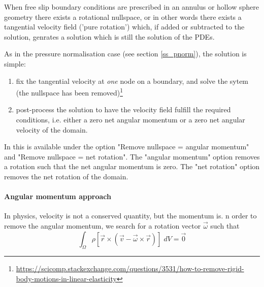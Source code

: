 
When free slip boundary conditions are prescribed in an annulus or
hollow sphere geometry there exists a rotational nullspace, or in other words there exists
a tangential velocity field ('pure rotation') which, 
if added or subtracted to the solution, genrates a solution which is still the solution of the PDEs. 

As in the pressure normalisation case (see section \ref{ss_pnorm}), the solution is simple:
\begin{enumerate}
\item fix the tangential velocity at {\it one} node on a boundary, and solve the sytem (the nullspace 
has been removed)\footnote{\url{https://scicomp.stackexchange.com/questions/3531/how-to-remove-rigid-body-motions-in-linear-elasticity}}
\item post-process the solution to have the velocity field fulfill the required conditions, i.e.
either a zero net angular momentum or a zero net angular velocity of the domain. 
\end{enumerate}

\begin{remark}
In \aspect{} this is available under the option 
"Remove nullspace = angular momentum" and "Remove nullspace = net rotation".
The "angular momentum" option removes a rotation such that the net angular momentum is zero.
The "net rotation" option removes the net rotation of the domain.
\end{remark}

\paragraph{Angular momentum approach}

In physics, velocity is not a conserved quantity, but the momentum is. 
n order to remove the angular momentum, we search for a rotation
vector ${\vec \omega}$ such that
\begin{equation}
\int_\Omega \rho[{\vec r} \times ({\vec v}-{\vec \omega} \times {\vec r})] \; dV= \vec 0
\end{equation}

